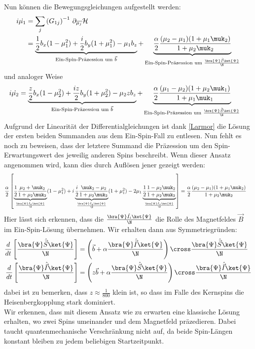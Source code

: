 \noindent Nun können die Bewegungsgleichungen aufgestellt werden:
\begin{align}
    i\dot{\mu_1} &= \sum_{j}\left(G_{1j}\right)^{-1}\thinspace \partial_{\overline{\mu_j}}\mathcal{H}  \\
    &=\underbrace{\frac{1}{2}b_x(1-\mu_1^2) + \frac{i}{2}b_y(1+\mu_1^2) -\mu_1 b_z}_{\text{Ein-Spin-Präzession um } \vec{b}} +\underbrace{\frac{\alpha}{2} \frac{(\mu_2-\mu_1)(1+\mu_1\muk_2)}{1+\mu_2\muk_2}}_{\text{Ein-Spin-Präzession um } \frac{\bra{\Psi}\hat{\vec{I}}\ket{\Psi}}{\N}  }    
\end{align}
und analoger Weise 
\begin{align}
    i\dot{\mu_2} &= \underbrace{\frac{z}{2}b_x(1-\mu_2^2) + \frac{iz}{2}b_y(1+\mu_2^2) -\mu_2 z b_z}_{\text{Ein-Spin-Präzession um } \vec{b}} +\underbrace{\frac{\alpha}{2} \frac{(\mu_1-\mu_2)(1+\mu_2\muk_1)}{1+\mu_1\muk_1}}_{\text{Ein-Spin-Präzession um } \frac{\bra{\Psi}\hat{\vec{S}}\ket{\Psi}}{\N}  }
\end{align}
\noindent Aufgrund der Linearität der Differentialgleichungen ist dank \autoref{Larmor} die Lösung der ersten beiden Summanden aus dem Ein-Spin-Fall 
zu entlesen. Nun fehlt es noch zu beweisen, dass der letztere Summand die Präzession um den Spin-Erwartungswert des jeweilig anderen Spins beschreibt. 
Wenn dieser Ansatz angenommen wird, kann dies durch Auflösen jener gezeigt werden:  
\begin{align}
     \frac{\alpha}{2}\left[\underbrace{\frac{1}{2}\frac{\mu_2 + \muk_2}{1+\mu_2\muk_2}}_{\frac{\bra{\Psi}\hat{I}_x\ket{\Psi}}{\N}}(1-\mu_1^2) 
     + i \underbrace{\frac{i}{2}\frac{\muk_2 -\mu_2}{1+\mu_2\muk_2}}_{\frac{\bra{\Psi}\hat{I}_y\ket{\Psi}}{\N}}(1+\mu_1^2) 
     - 2\mu_1\underbrace{\frac{1}{2}\frac{1-\mu_2\muk_2}{1+\mu_2\muk_2}}_{\frac{\bra{\Psi}\hat{I}_z\ket{\Psi}}{\N}} \right]
     &= \frac{\alpha}{2} \frac{(\mu_2-\mu_1)(1+\mu_1\muk_2)}{1+\mu_2\muk_2}
\end{align}
Hier lässt sich erkennen, dass die $\frac{\bra{\Psi}\hat{I_i}\ket{\Psi}}{\N}$ die Rolle des Magnetfeldes $\vec{B}$ im Ein-Spin-Lösung 
übernehmen. Wir erhalten dann aus Symmetriegründen:
\begin{align}
    \frac{d}{dt}\left[\frac{\bra{\Psi}\hat{\vec{S}}\ket{\Psi}}{\N}\right] &= \left(\vec{b} + \alpha \frac{\bra{\Psi}\hat{\vec{I}}\ket{\Psi}}{\N}\right)\cross\frac{\bra{\Psi}\hat{\vec{S}}\ket{\Psi}}{\N} \label{DGL_1}\\
    \frac{d}{dt}\left[\frac{\bra{\Psi}\hat{\vec{I}}\ket{\Psi}}{\N}\right] &= \left(z\vec{b} + \alpha \frac{\bra{\Psi}\hat{\vec{S}}\ket{\Psi}}{\N}\right)\cross\frac{\bra{\Psi}\hat{\vec{I}}\ket{\Psi}}{\N} \label{DGL_2}
\end{align}
\noindent dabei ist zu bemerken, dass $z\approx\frac{1}{800}$ klein ist, so dass im Falle des Kernspins die Heisenbergkopplung stark dominiert.\\
Wir erkennen, dass mit diesem Ansatz wie zu erwarten eine klassische Lösung erhalten, wo zwei Spins umeinander und dem Magnetfeld präzedieren. Dabei 
taucht quantenmechanische Verschränkung nicht auf, da beide Spin-Längen konstant bleiben zu jedem beliebigen Startzeitpunkt.








